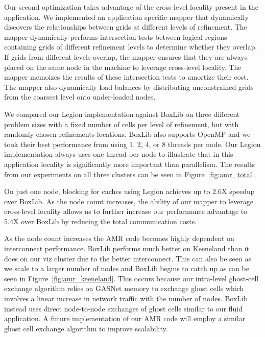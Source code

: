 Our second optimization takes advantage of the cross-level locality present in the application.  We implemented
an application specific mapper that dynamically discovers the relationships between
grids at different levels of refinement.  The mapper dynamically performs intersection tests between logical regions
containing grids of different refinement levels to determine whether they overlap.  
If grids from different levels overlap, the mapper
ensures that they are always placed on the same node in the machine to leverage cross-level locality.  The mapper
memoizes the results of these intersection tests to amortize their cost.  The mapper also dynamically
load balances by distributing unconstrained grids from the coarsest level onto under-loaded nodes.

We compared our Legion implementation against BoxLib on three different problem sizes with a fixed number
of cells per level of refinement, but with randomly chosen refinements locations.  BoxLib also supports OpenMP
and we took their best performance from using 1, 2, 4, or 8 threads per node.  Our Legion implementation
always uses one thread per node to illustrate that in this application locality is significantly more important 
than parallelism.  The results from our experiments on all three clusters can be seen in Figure~\ref{fig:amr_total}. 

On just one node, blocking for caches using Legion achieves up to 2.6X speedup over BoxLib.  As the node count 
increases, the ability of our mapper to leverage cross-level locality allows us to further increase
our performance advantage to 5.4X over BoxLib by reducing the total communication costs.  

As the node count increases the AMR code becomes highly dependent on interconnect performance.  BoxLib performs much better
on Keeneland than it does on our viz cluster due to the better interconnect.  This can also be seen as we scale
to a larger number of nodes and BoxLib begins to catch up as can be seen in Figure~\ref{fig:amr_keeneland}.  
This occurs because our intra-level ghost-cell exchange algorithm relies on GASNet memory to exchange ghost cells which 
involves a linear increase in network traffic with the number of nodes.  BoxLib instead uses direct
node-to-node exchanges of ghost cells similar to our fluid application.  A future implementation of our AMR code 
will employ a similar ghost cell exchange algorithm to improve scalability.

